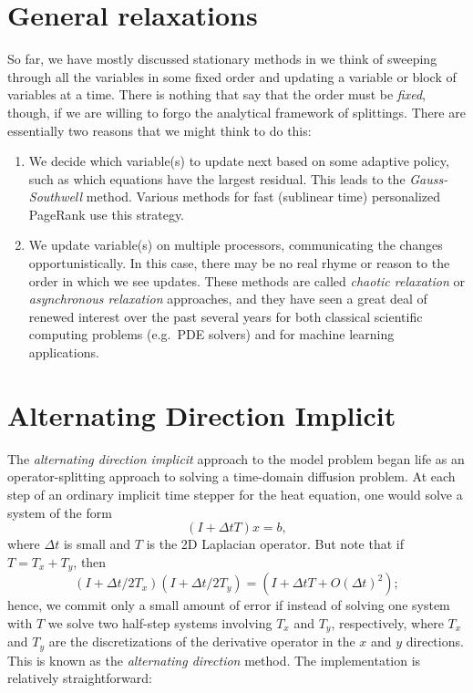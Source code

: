 \documentclass[12pt, leqno]{article} %
\begin{document}

\section{General relaxations}

So far, we have mostly discussed stationary methods in we think of
sweeping through all the variables in some fixed order and
updating a variable or block of variables at a time.  There is nothing
that say that the order must be {\em fixed}, though, if we are willing
to forgo the analytical framework of splittings.  There are essentially
two reasons that we might think to do this:
\begin{enumerate}
\item
  We decide which variable(s) to update next based on some adaptive
  policy, such as which equations have the largest residual.  This
  leads to the {\em Gauss-Southwell} method.  Various methods for fast
  (sublinear time) personalized PageRank use this strategy.
\item
  We update variable(s) on multiple processors, communicating the
  changes opportunistically.  In this case, there may be no real rhyme
  or reason to the order in which we see updates.  These methods are
  called {\em chaotic relaxation} or {\em asynchronous relaxation}
  approaches, and they have seen a great deal of renewed interest over
  the past several years for both classical scientific computing problems
  (e.g.~PDE solvers) and for machine learning applications.
\end{enumerate}

\section{Alternating Direction Implicit}

The {\em alternating direction implicit} approach to the model problem
began life as an operator-splitting approach to solving a time-domain
diffusion problem.  At each step of an ordinary implicit time stepper
for the heat equation, one would solve a system of the form
\[
  (I+\Delta t T) x = b,
\]
where $\Delta t$ is small and $T$ is the 2D Laplacian operator.  But
note that if $T = T_x + T_y$, then
\[
  (I+\Delta t/2 T_x)(I+ \Delta t/2 T_y) = (I+\Delta t T + O(\Delta t)^2);
\]
hence, we commit only a small amount of error if instead of solving one
system with $T$ we solve two half-step systems involving $T_x$ and $T_y$,
respectively, where $T_x$ and $T_y$ are the discretizations of the
derivative operator in the $x$ and $y$ directions.  This is known as the
{\em alternating direction} method.  The implementation is relatively
straightforward:

\end{document}
